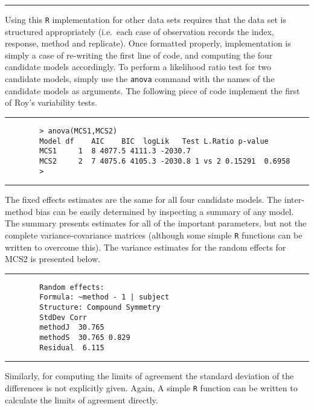\documentclass[12pt, a4paper]{report}
\theoremstyle{plain}
\theoremstyle{definition}
\theoremstyle{remark}
\begin{document}
		\hrule
		\vspace{1cm}
		Using this \texttt{R} implementation for other data sets requires that the data set is structured appropriately (i.e.\ each case of observation records the index, response, method and replicate). Once formatted properly, implementation is simply a case of re-writing the first line of code, and computing the four candidate models accordingly.
		\newpage
		To perform a likelihood ratio test for two candidate models, simply use the \texttt{anova} command with the names of the candidate models as arguments. The following piece of code implement the first of Roy's variability tests.
		\\
		\hrule
		\begin{verbatim}
		> anova(MCS1,MCS2)
		Model df    AIC    BIC  logLik   Test L.Ratio p-value
		MCS1     1  8 4077.5 4111.3 -2030.7
		MCS2     2  7 4075.6 4105.3 -2030.8 1 vs 2 0.15291  0.6958
		>
		\end{verbatim}
		\hrule
		\vspace{1cm}
		The fixed effects estimates are the same for all four candidate models. The inter-method bias can be easily determined by inspecting a summary of any model. The summary presents estimates for all of the important parameters, but not the complete variance-covariance matrices (although some simple \texttt{R} functions can be written to overcome this). The variance estimates for the random effects for MCS2 is presented below.
		\\
		\hrule
		\begin{verbatim}
		Random effects:
		Formula: ~method - 1 | subject
		Structure: Compound Symmetry
		StdDev Corr
		methodJ  30.765
		methodS  30.765 0.829
		Residual  6.115
		\end{verbatim}
		\hrule
		\vspace{1cm}
		Similarly, for computing the limits of agreement the standard deviation of the differences is not explicitly given. Again, A simple \texttt{R} function can be written to calculate the limits of agreement directly.
		
		\newpage
		
		
		\newpage
		
		
		
\end{document}
